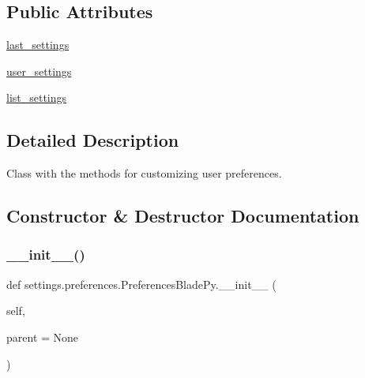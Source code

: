 \subsection*{Public Attributes}
\begin{DoxyCompactItemize}
\item 
\hyperlink{classsettings_1_1preferences_1_1_preferences_blade_py_a8904394496c57e265ab1cf0346b025d9}{last\+\_\+settings}
\item 
\hyperlink{classsettings_1_1preferences_1_1_preferences_blade_py_a0a02958126e9787f79af1a0f45fab30c}{user\+\_\+settings}
\item 
\hyperlink{classsettings_1_1preferences_1_1_preferences_blade_py_aec84d483efd9155fc73699fe365ac9c2}{list\+\_\+settings}
\end{DoxyCompactItemize}


\subsection{Detailed Description}
Class with the methods for customizing user preferences. 

\subsection{Constructor \& Destructor Documentation}
\hypertarget{classsettings_1_1preferences_1_1_preferences_blade_py_af773a0c74e666c299d2334a21966f8c9}{}\label{classsettings_1_1preferences_1_1_preferences_blade_py_af773a0c74e666c299d2334a21966f8c9} 
\subsubsection{\texorpdfstring{\+\_\+\+\_\+init\+\_\+\+\_\+()}{\_\_init\_\_()}}
{\footnotesize\ttfamily def settings.\+preferences.\+Preferences\+Blade\+Py.\+\_\+\+\_\+init\+\_\+\+\_\+ (\begin{DoxyParamCaption}\item[{}]{self,  }\item[{}]{parent = {\ttfamily None} }\end{DoxyParamCaption})}



